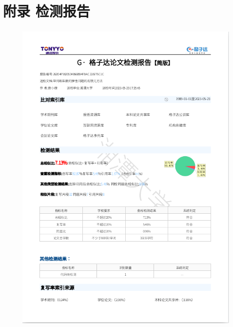 \documentclass[a4paper,UTF8,titlepage,10pt]{ctexart}
\numberwithin{equation}{subsection}
\begin{document}
\section{附录 检测报告}

\begin{figure}[h]
	\centering
	\includegraphics[height=16cm,width=13cm]{./push/1.png}
\end{figure}

\newpage
\end{document}
